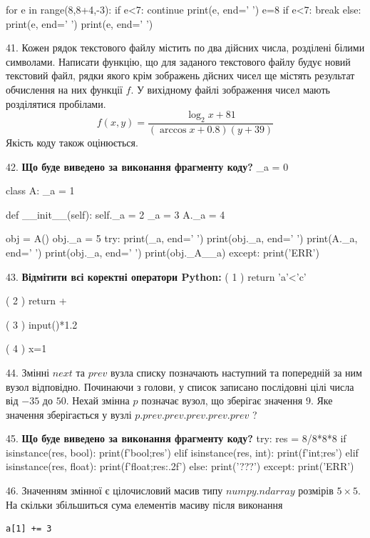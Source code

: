 \documentclass[11pt]{article}
\begin{document}
for e in range(8,8+4,-3):
    if e<7:
        continue
    print(e, end=' ')
    e=8
    if e<7:
        break
else:
    print(e, end=' ')
print(e, end=' ')
\par\vspace{5mm}
41. 
Кожен рядок текстового файлу містить по два дійсних числа, розділені білими символами.
Написати функцію, що для заданого текстового файлу будує новий текстовий файл, рядки якого крім зображень дйсних чисел ще містять результат обчислення на них функції $f$. У вихідному файлі зображення чисел мають розділятися пробілами. 
$$f(x, y) =\frac{\log_{2} x + 81}{(\arccos x + 0.8) (y + 39)}$$ 
Якість коду також оцінюється.

\par\vspace{5mm}
42. \textbf{Що буде виведено за виконання фрагменту коду?}
_a = 0

class A:
    _a = 1
    
    def __init__(self):
        self._a = 2
        _a = 3
        A._a = 4

obj = A()
obj._a = 5
try:
    print(_a, end=' ')
    print(obj._a, end=' ')
    print(A._a, end=' ')
    print(obj._a, end=' ')
    print(obj._A__a)
except:
    print('ERR')
\par\vspace{5mm}
43. %
\textbf{Відмітити всі коректні оператори Python:}
( 1 ) return 'a'<'c'

( 2 ) return +

( 3 ) input()*1.2

( 4 ) x=1%
\par\vspace{5mm}
44. 
Змінні $next$ та $prev$ вузла списку позначають наступний та попередній за ним вузол відповідно. Починаючи з голови, у список записано послідовні цілі числа від $-35$ до $50$. Нехай змінна $p$ позначає вузол, що зберігає значення $9$.
Яке значення зберігається у вузлі $p.prev.prev.prev.prev.prev$ ?
\par\vspace{5mm}
45. \textbf{Що буде виведено за виконання фрагменту коду?}
try:
    res = 8/8*8*8
    if isinstance(res, bool):
        print(f'bool;{res}')
    elif isinstance(res, int):
        print(f'int;{res}')
    elif isinstance(res, float):
        print(f'float;{res:.2f}')
    else:
        print('???')
except:
    print('ERR')
\par\vspace{5mm}
46. 
Значенням змінної  є цілочисловий масив типу $numpy.ndarray$ розмірів $5{\times}5$. На скільки збільшиться сума елементів масиву  після виконання
\begin{verbatim}
a[1] += 3
\end{verbatim}
\end{document}
